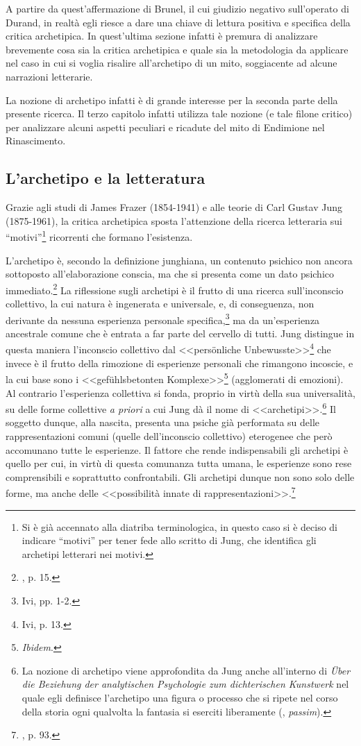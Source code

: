 \documentclass[12pt,a4paper,openright, oneside]{book}
\begin{document}
A partire da quest'affermazione di Brunel, il cui giudizio negativo sull'operato di Durand, in realtà egli riesce a dare una chiave di lettura positiva e specifica della critica archetipica. In quest'ultima sezione infatti è premura di analizzare brevemente cosa sia la critica archetipica e quale sia la metodologia da applicare nel caso in cui si voglia risalire all'archetipo di un mito, soggiacente ad alcune narrazioni letterarie.

La nozione di archetipo infatti è di grande interesse per la seconda parte della presente ricerca. Il terzo capitolo infatti utilizza tale nozione (e tale filone critico) per analizzare alcuni aspetti peculiari e ricadute del mito di Endimione nel Rinascimento.

\subsection{L'archetipo e la letteratura}

Grazie agli studi di James Frazer (1854-1941) e alle teorie di Carl Gustav Jung (1875-1961), la critica archetipica sposta l'attenzione della ricerca  letteraria sui ``motivi''\footnote{Si è già accennato alla diatriba terminologica, in questo caso si è deciso di indicare ``motivi'' per tener fede allo scritto di Jung, che identifica gli archetipi letterari nei motivi.} ricorrenti che formano l'esistenza.

L'archetipo è, secondo la definizione junghiana, un contenuto psichico non ancora sottoposto all'elaborazione conscia, ma che si presenta come un dato psichico immediato.\footnote{\cite{Jung}, p. 15.}  La riflessione sugli archetipi è il frutto di una ricerca sull'inconscio collettivo, la cui natura è ingenerata e universale, e, di conseguenza, non derivante da nessuna esperienza personale specifica,\footnote{Ivi, pp. 1-2.} ma da un'esperienza ancestrale comune che è entrata a far parte del cervello di tutti. Jung distingue in questa maniera l'inconscio collettivo dal <<pers\"onliche Unbewusste>>\footnote{Ivi, p. 13.} che invece è il frutto della rimozione di esperienze personali che rimangono incoscie, e la cui base sono i <<gef\"uhlsbetonten Komplexe>>\footnote{\textit{Ibidem}.} (agglomerati di emozioni). Al contrario l'esperienza collettiva si fonda, proprio in virtù della sua universalità, su delle forme collettive \textit{a priori} a cui Jung  dà il nome di <<archetipi>>.\footnote{La nozione di archetipo viene approfondita da Jung anche all'interno di \textit{Über die Beziehung der analytischen Psychologie zum dichterischen Kunstwerk} nel quale egli definisce l'archetipo una figura o processo che si ripete nel corso della storia ogni qualvolta la fantasia si eserciti liberamente (\cite{Jung1}, \textit{passim}).}
Il soggetto dunque, alla nascita, presenta una psiche già performata su delle rappresentazioni comuni (quelle dell'inconscio collettivo) eterogenee che però accomunano tutte le esperienze.  Il fattore che rende indispensabili gli archetipi è quello per cui, in virtù di questa comunanza tutta umana, le esperienze sono rese comprensibili e soprattutto confrontabili. Gli archetipi dunque non sono solo delle forme, ma anche delle <<possibilità innate di rappresentazioni>>.\footnote{\cite{Jung1}, p. 93.}
\end{document}

